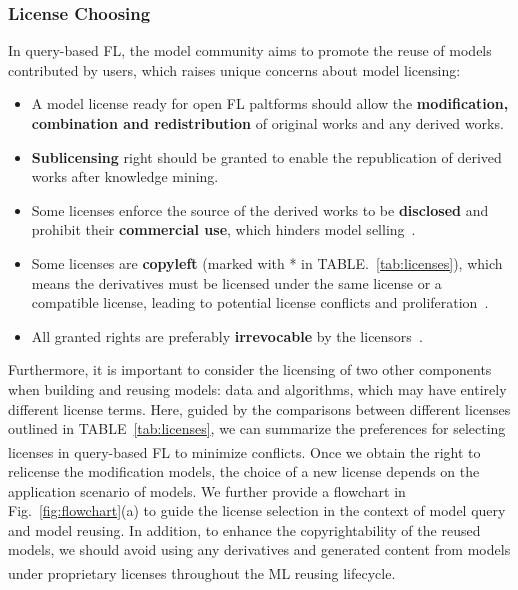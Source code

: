 
\subsubsection{License Choosing}
\label{sec:choosing}
In query-based FL, the model community aims to promote the reuse of models contributed by users, which raises unique concerns about model licensing:
\begin{itemize}
  \item A model license ready for open FL paltforms should allow the \textbf{modification, combination and redistribution} of original works and any derived works.
  \item \textbf{Sublicensing} right should be granted to enable the republication of derived works after knowledge mining.
  \item Some licenses enforce the source of the derived works to be \textbf{disclosed} and prohibit their \textbf{commercial use}, which hinders model selling~\cite{chen2019towards}.
  \item Some licenses are \textbf{copyleft} (marked with * in TABLE.~\ref{tab:licenses}), which means the derivatives must be licensed under the same license or a compatible license, leading to potential license conflicts and proliferation~\cite{gomulkiewicz2009open}.
  \item All granted rights are preferably \textbf{irrevocable} by the licensors~\cite{reddy2009jacobsen}.
\end{itemize}

Furthermore, it is important to consider the licensing of two other components when building and reusing models: data and algorithms, which may have entirely different license terms. 
Here, guided by the comparisons between different licenses outlined in TABLE~\ref{tab:licenses}, we can summarize the preferences for selecting licenses in query-based FL to minimize conflicts\textsuperscript{}.
Once we obtain the right to relicense the modification models, the choice of a new license depends on the application scenario of models. 
We further provide a flowchart in Fig.~\ref{fig:flowchart}(a) to guide the license selection in the context of model query and model reusing.
In addition, to enhance the copyrightability of the reused models, we should avoid using any derivatives and generated content from models under proprietary licenses throughout the ML reusing lifecycle\textsuperscript{}.

